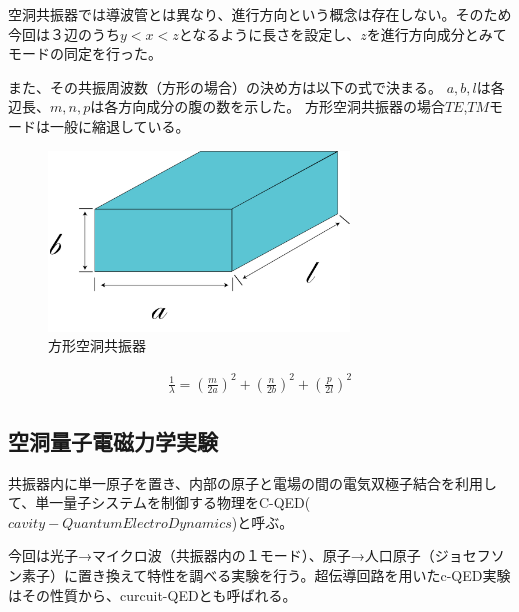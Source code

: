 空洞共振器では導波管とは異なり、進行方向という概念は存在しない。そのため今回は３辺のうち$y<x<z$となるように長さを設定し、$z$を進行方向成分とみてモードの同定を行った。

また、その共振周波数（方形の場合）の決め方は以下の式で決まる。
$a,b,l$は各辺長、$m,n,p$は各方向成分の腹の数を示した。
方形空洞共振器の場合$TE$,$TM$モードは一般に縮退している。

\vspace{10 mm}

\begin{figure}[h]
  \begin{center}
    \includegraphics[width=8cm]{./image/空洞共振器.png}
    \caption{方形空洞共振器}
    \label{fig:Cavity}
  \end{center}
\end{figure}

\begin{eqnarray}
    \frac{1}{\lambda} = (\frac{m}{2a})^2 + (\frac{n}{2b})^2 + (\frac{p}{2l})^2
\end{eqnarray}

\subsection*{空洞量子電磁力学実験}
共振器内に単一原子を置き、内部の原子と電場の間の電気双極子結合を利用して、単一量子システムを制御する物理をC-QED($cavity - Quantum ElectroDynamics$)と呼ぶ。

今回は光子→マイクロ波（共振器内の１モード）、原子→人口原子（ジョセフソン素子）に置き換えて特性を調べる実験を行う。超伝導回路を用いたc-QED実験はその性質から、curcuit-QEDとも呼ばれる。
